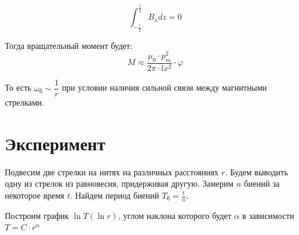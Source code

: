 \documentclass{letask}
\begin{document}
\begin{equation}
\int_{-\frac{l}{2}}^{\frac{l}{2}} B_x dz = 0
\end{equation}

Тогда вращательный момент будет:
\begin{equation}
M \approx \dfrac{\mu_0 \cdot p_m^2}{2 \pi \cdot lx^2} \cdot \varphi
\end{equation}

То есть $\omega_\text{б} \sim \dfrac{1}{r}$ при условии наличия сильной связи между магнитными стрелками.


\section{Эксперимент}
Подвесим две стрелки на нитях на различных расстояниях $r$. Будем выводить одну из стрелок из равновесия, придерживая другую. Замерим $n$ биений за некоторое время $t$. Найдем период биений $T_\text{б} = \frac{t}{n}$.

\begin{table}[H]
\centering
{}
\caption{Данные эксперимента}
\end{table}

Построим график $\ln T(\ln r)$, углом наклона которого будет $\alpha$ в зависимости $T = C \cdot r^{\alpha}$
\end{document}
